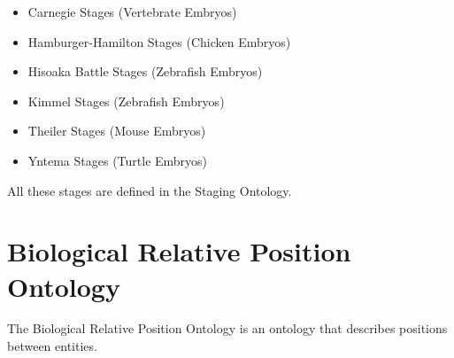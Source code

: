 \begin{itemize}
\item Carnegie Stages\cite{CarnegieStage}
  (Vertebrate Embryos)
\item Hamburger-Hamilton
  Stages\cite{HamburgerHamiltonStage}
  (Chicken Embryos)
\item Hisoaka Battle
  Stages\cite{HisaokaBattleStage}
  (Zebrafish Embryos)
\item Kimmel Stages\cite{KimmelStage} (Zebrafish
  Embryos)
\item Theiler Stages\cite{TheilerStage} (Mouse
  Embryos)
\item Yntema Stages\cite{YntemaStage} (Turtle
  Embryos)
\end{itemize}

All these stages are defined in the Staging
Ontology.



\section{Biological Relative Position Ontology}

The Biological Relative Position
Ontology
is an ontology that describes positions between
entities.
